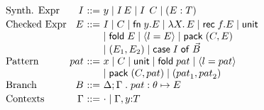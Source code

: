 \documentclass{article}
\begin{document}
\[
\begin{array}{l@{~}r@{~}c@{~}l}
\mbox{Synth. Expr} & I  & \bnfas & y 
  \bnfalt \app I E %
  \bnfalt \app I \ctxi C 
   \bnfalt  (E : T)
\\[2pt]
\mbox{Checked Expr} & E & \bnfas &  I 
  \bnfalt C %
  \bnfalt \fn{y}{E}
  \bnfalt \mlam{X}{E} 
  \bnfalt \rec{f}{E} 
  \bnfalt \m{unit}\\
& & &   \bnfalt \fold E  \bnfalt \dsum{l=E}   \bnfalt \pack (C , E) \\
&&&  \bnfalt (E_1, E_2) \bnfalt \casebox{I}{\vec{B}} \\
\mbox{Pattern } & {pat} & \bnfas & x \bnfalt C \bnfalt \m{unit} \bnfalt \fold {pat} \bnfalt \dsum{l = {pat}} \\
                         &          &            & \bnfalt \pack (C , {pat}) \bnfalt ({pat}_1, {pat}_2)\\
\mbox{Branch  } & B  & \bnfas &  \casearm{\Delta ; \Gamma\;.\; pat : \theta}{E}
\\[2pt]
\mbox{Contexts} & \Gamma  & \bnfas &  \edot \bnfalt \Gamma, y{:}T \\
\end{array}
\]  
\end{document}
